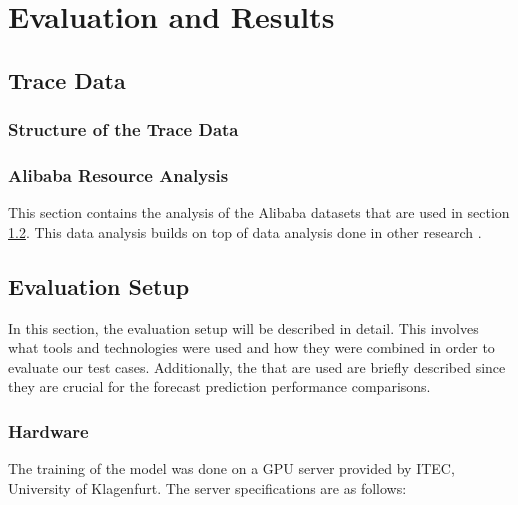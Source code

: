 \chapter{Evaluation and Results}
\label{ch:evaluation-and-results}

\section{Trace Data}
\label{sec:data-analysis-evaluation}

  \subsection{Structure of the Trace Data}

  \subsection{Alibaba Resource Analysis}
  \label{sec:alibaba-resource-analysis-data-analysis}

    This section contains the analysis of the Alibaba datasets that are used in section \ref{sec:evaluation-setup}. This data analysis builds on top of data analysis done in other research \cite{fengcunDeepJSJobScheduling2023}.

\section{Evaluation Setup}
\label{sec:evaluation-setup}

  In this section, the evaluation setup will be described in detail. 
  This involves what tools and technologies were used and how they were combined in order to evaluate our test cases. Additionally, the  that are used are briefly described since they are crucial for the forecast prediction performance comparisons.
  
  \subsection{Hardware}
  \label{sec:hardware}

    The training of the  model was done on a GPU server provided by ITEC, University of Klagenfurt. The server specifications are as follows:

